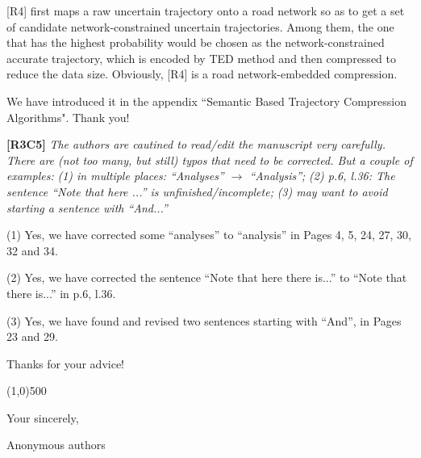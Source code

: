 \documentclass{letter}
\begin{document}
[R4] first maps a raw uncertain trajectory onto a road network so as to get a set of candidate network-constrained uncertain trajectories. Among them, the one that has the highest probability would be chosen
as the network-constrained accurate trajectory, which is encoded by TED method and then compressed to reduce the data size. Obviously, [R4] is a road network-embedded compression. 


We have introduced it in the appendix ``Semantic Based Trajectory Compression Algorithms". Thank you!


\textbf{[R3C5]} \emph{The authors are cautined to read/edit the manuscript very carefully. There are (not too many, but still) typos that need to be corrected. But a couple of examples:}
  \emph{(1) in multiple places: ``Analyses'' $\rightarrow$ ``Analysis'';}
  \emph{(2) p.6, l.36: The sentence ``Note that here ...'' is unfinished/incomplete;}
  \emph{(3) may want to avoid starting a sentence with ``And...''}


(1) Yes, we have corrected some ``analyses'' to ``analysis'' in Pages 4, 5, 24, 27, 30, 32 and 34.

(2) Yes, we have corrected the sentence ``Note that here there is...'' to ``Note that there is...'' in p.6, l.36.

(3) Yes, we have found and revised two sentences starting with ``And'', in Pages 23 and 29.

Thanks for your advice!

\line(1,0){500}



Your sincerely,

Anonymous authors

%
%
\end{document}
